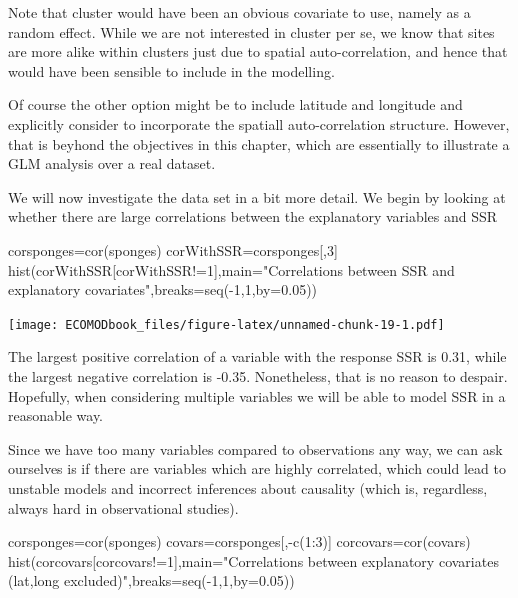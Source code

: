\documentclass[
]{book}
\newenvironment{Shaded}{\begin{snugshade}}{\end{snugshade}}
\newcommand{\AttributeTok}[1]{\textcolor[rgb]{0.77,0.63,0.00}{#1}}
\newcommand{\DecValTok}[1]{\textcolor[rgb]{0.00,0.00,0.81}{#1}}
\newcommand{\FloatTok}[1]{\textcolor[rgb]{0.00,0.00,0.81}{#1}}
\newcommand{\FunctionTok}[1]{\textcolor[rgb]{0.00,0.00,0.00}{#1}}
\newcommand{\NormalTok}[1]{#1}
\newcommand{\OtherTok}[1]{\textcolor[rgb]{0.56,0.35,0.01}{#1}}
\newcommand{\SpecialCharTok}[1]{\textcolor[rgb]{0.00,0.00,0.00}{#1}}
\newcommand{\StringTok}[1]{\textcolor[rgb]{0.31,0.60,0.02}{#1}}
\begin{document}
Note that cluster would have been an obvious covariate to use, namely as a random effect. While we are not interested in cluster per se, we know that sites are more alike within clusters just due to spatial auto-correlation, and hence that would have been sensible to include in the modelling.

Of course the other option might be to include latitude and longitude and explicitly consider to incorporate the spatiall auto-correlation structure. However, that is beyhond the objectives in this chapter, which are essentially to illustrate a GLM analysis over a real dataset.

We will now investigate the data set in a bit more detail. We begin by looking at whether there are large correlations between the explanatory variables and SSR

\begin{Shaded}
\begin{Highlighting}[]
\NormalTok{corsponges}\OtherTok{=}\FunctionTok{cor}\NormalTok{(sponges)}
\NormalTok{corWithSSR}\OtherTok{=}\NormalTok{corsponges[,}\DecValTok{3}\NormalTok{]}
\FunctionTok{hist}\NormalTok{(corWithSSR[corWithSSR}\SpecialCharTok{!=}\DecValTok{1}\NormalTok{],}\AttributeTok{main=}\StringTok{"Correlations between SSR and explanatory covariates"}\NormalTok{,}\AttributeTok{breaks=}\FunctionTok{seq}\NormalTok{(}\SpecialCharTok{{-}}\DecValTok{1}\NormalTok{,}\DecValTok{1}\NormalTok{,}\AttributeTok{by=}\FloatTok{0.05}\NormalTok{))}
\end{Highlighting}
\end{Shaded}

\texttt{[image: ECOMODbook\_files/figure-latex/unnamed-chunk-19-1.pdf]}

The largest positive correlation of a variable with the response SSR is 0.31, while the largest negative correlation is -0.35. Nonetheless, that is no reason to despair. Hopefully, when considering multiple variables we will be able to model SSR in a reasonable way.

Since we have too many variables compared to observations any way, we can ask ourselves is if there are variables which are highly correlated, which could lead to unstable models and incorrect inferences about causality (which is, regardless, always hard in observational studies).

\begin{Shaded}
\begin{Highlighting}[]
\NormalTok{corsponges}\OtherTok{=}\FunctionTok{cor}\NormalTok{(sponges)}
\NormalTok{covars}\OtherTok{=}\NormalTok{corsponges[,}\SpecialCharTok{{-}}\FunctionTok{c}\NormalTok{(}\DecValTok{1}\SpecialCharTok{:}\DecValTok{3}\NormalTok{)]}
\NormalTok{corcovars}\OtherTok{=}\FunctionTok{cor}\NormalTok{(covars)}
\FunctionTok{hist}\NormalTok{(corcovars[corcovars}\SpecialCharTok{!=}\DecValTok{1}\NormalTok{],}\AttributeTok{main=}\StringTok{"Correlations between explanatory covariates (lat,long excluded)"}\NormalTok{,}\AttributeTok{breaks=}\FunctionTok{seq}\NormalTok{(}\SpecialCharTok{{-}}\DecValTok{1}\NormalTok{,}\DecValTok{1}\NormalTok{,}\AttributeTok{by=}\FloatTok{0.05}\NormalTok{))}
\end{Highlighting}
\end{Shaded}
\end{document}
